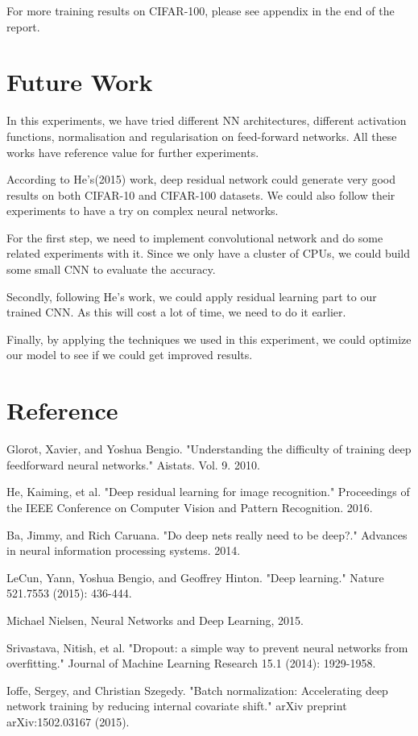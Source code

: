 \documentclass[]{article}
\begin{document}
For more training results on CIFAR-100, please see appendix in the end of the report.
\section{Future Work}

In this experiments, we have tried different NN architectures, different activation functions, normalisation and regularisation on feed-forward networks. All these works have reference value for further experiments.

According to He's(2015) work, deep residual network could generate very good results on both CIFAR-10 and CIFAR-100 datasets. We could also follow their experiments to have a try on complex neural networks.

For the first step, we need to implement convolutional network and do some related experiments with it. Since we only have a cluster of CPUs, we could build some small CNN to evaluate the accuracy.

Secondly, following He's work, we could apply residual learning part to our trained CNN. As this will cost a lot of time, we need to do it earlier.

Finally, by applying the techniques we used in this experiment, we could optimize our model to see if we could get improved results.
\newpage
\section{Reference}

Glorot, Xavier, and Yoshua Bengio. "Understanding the difficulty of training deep feedforward neural networks." Aistats. Vol. 9. 2010.

He, Kaiming, et al. "Deep residual learning for image recognition." Proceedings of the IEEE Conference on Computer Vision and Pattern Recognition. 2016.

Ba, Jimmy, and Rich Caruana. "Do deep nets really need to be deep?." Advances in neural information processing systems. 2014.

LeCun, Yann, Yoshua Bengio, and Geoffrey Hinton. "Deep learning." Nature 521.7553 (2015): 436-444.

Michael Nielsen, Neural Networks and Deep Learning, 2015.

Srivastava, Nitish, et al. "Dropout: a simple way to prevent neural networks from overfitting." Journal of Machine Learning Research 15.1 (2014): 1929-1958.

Ioffe, Sergey, and Christian Szegedy. "Batch normalization: Accelerating deep network training by reducing internal covariate shift." arXiv preprint arXiv:1502.03167 (2015).
\end{document}
